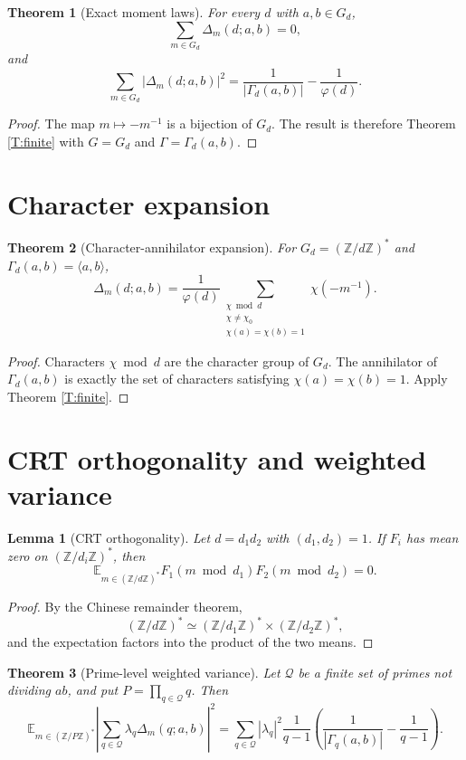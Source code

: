 \documentclass[11pt]{article}
\newtheorem{theorem}{Theorem}
\newtheorem{lemma}{Lemma}
\newcommand{\Z}{\mathbb Z}
\newcommand{\E}{\mathbb E}
\newcommand{\1}{\mathbf 1}
\begin{document}
\begin{theorem}[Exact moment laws]\label{T:moments}
For every \(d\) with \(a,b\in G_d\),
\[
\sum_{m\in G_d}\Delta_m(d;a,b)=0,
\]
and
\[
\sum_{m\in G_d}|\Delta_m(d;a,b)|^2
=
\frac1{|\Gamma_d(a,b)|}-\frac1{\varphi(d)}.
\]
\end{theorem}

\begin{proof}
The map \(m\mapsto -m^{-1}\) is a bijection of \(G_d\).  The result is therefore Theorem \ref{T:finite} with \(G=G_d\) and \(\Gamma=\Gamma_d(a,b)\).
\end{proof}

\section{Character expansion}

\begin{theorem}[Character-annihilator expansion]\label{T:char}
For \(G_d=(\Z/d\Z)^*\) and \(\Gamma_d(a,b)=\langle a,b\rangle\),
\[
\Delta_m(d;a,b)=
\frac1{\varphi(d)}
\sum_{\substack{\chi\bmod d\\ \chi\ne\chi_0\\ \chi(a)=\chi(b)=1}}
\chi(-m^{-1}).
\]
\end{theorem}

\begin{proof}
Characters \(\chi\bmod d\) are the character group of \(G_d\).  The annihilator of \(\Gamma_d(a,b)\) is exactly the set of characters satisfying \(\chi(a)=\chi(b)=1\).  Apply Theorem \ref{T:finite}.
\end{proof}

\section{CRT orthogonality and weighted variance}

\begin{lemma}[CRT orthogonality]\label{L:crt}
Let \(d=d_1d_2\) with \((d_1,d_2)=1\).  If \(F_i\) has mean zero on \((\Z/d_i\Z)^*\), then
\[
\E_{m\in(\Z/d\Z)^*}F_1(m\bmod d_1)F_2(m\bmod d_2)=0.
\]
\end{lemma}

\begin{proof}
By the Chinese remainder theorem,
\[
(\Z/d\Z)^*\simeq(\Z/d_1\Z)^*\times(\Z/d_2\Z)^*,
\]
and the expectation factors into the product of the two means.
\end{proof}

\begin{theorem}[Prime-level weighted variance]\label{T:weighted}
Let \(\mathcal Q\) be a finite set of primes not dividing \(ab\), and put \(P=\prod_{q\in\mathcal Q}q\).  Then
\[
\E_{m\in(\Z/P\Z)^*}
\left|
\sum_{q\in\mathcal Q}\lambda_q\Delta_m(q;a,b)
\right|^2
=
\sum_{q\in\mathcal Q}
|\lambda_q|^2
\frac1{q-1}
\left(
\frac1{|\Gamma_q(a,b)|}-\frac1{q-1}
\right).
\]
\end{theorem}
\end{document}
